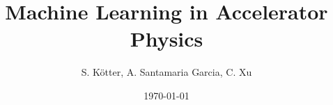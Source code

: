 
\usepackage[utf8]{inputenc}
\usepackage{hyperref}
\usepackage[legalpaper, margin=0.8in]{geometry}

\usepackage[backend=biber,
            bibstyle=custom-numeric-comp,   %
            citestyle=numeric-comp,         %
            sorting=none,                   %
            safeinputenc,
            maxnames=3,                     %
            minnames=1                      %
            ]{biblatex}

\renewcommand*{\newunitpunct}{\addcomma\space}             %

\setlength{\parindent}{0cm}

\author{S. Kötter, A. Santamaria Garcia, C. Xu}
\date{\today}
\title{Machine Learning in Accelerator Physics}


